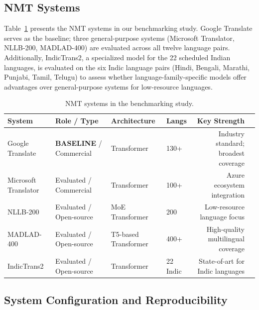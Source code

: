 \documentclass[Afour,sagev,times,doublespace]{sagej}
\begin{document}
\subsection{NMT Systems}

Table~\ref{tab:systems} presents the NMT systems in our benchmarking study. Google Translate serves as the baseline; three general-purpose systems (Microsoft Translator, NLLB-200, MADLAD-400) are evaluated across all twelve language pairs. Additionally, IndicTrans2,\cite{29} a specialized model for the 22 scheduled Indian languages, is evaluated on the six Indic language pairs (Hindi, Bengali, Marathi, Punjabi, Tamil, Telugu) to assess whether language-family-specific models offer advantages over general-purpose systems for low-resource languages.

\begin{table}[t]
\small\sf\centering
\caption{NMT systems in the benchmarking study.\label{tab:systems}}
\begin{tabular}{@{}llllrp{4cm}@{}}
\toprule
System & Role / Type & Architecture & Langs & Key Strength \\
\midrule
\rowcolor{blue!10} Google Translate & \textbf{BASELINE} / Commercial & Transformer & 130+ & Industry standard; broadest coverage \\
Microsoft Translator & Evaluated / Commercial & Transformer & 100+ & Azure ecosystem integration \\
NLLB-200 & Evaluated / Open-source & MoE Transformer & 200 & Low-resource language focus \\
MADLAD-400 & Evaluated / Open-source & T5-based Transformer & 400+ & High-quality multilingual coverage \\
IndicTrans2\cite{29} & Evaluated / Open-source & Transformer & 22 Indic & State-of-art for Indic languages \\
\bottomrule
\end{tabular}
\end{table}

\subsection{System Configuration and Reproducibility}
\end{document}
